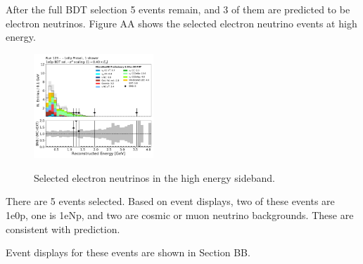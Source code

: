 After the full BDT selection 5 events remain, and 3 of them are predicted to be electron neutrinos.  
Figure AA shows the selected electron neutrino events at high energy.
\begin{figure}[H]
    \centering
    \includegraphics[width=0.4\textwidth]{1e0p/High_E_Sideband/BDT_selection/reco_e_07272020.pdf}
    \caption{Selected electron neutrinos in the high energy sideband.}
    \caption{} 
    \label{fig:HE_1eNp_1}
\end{figure}

There are 5 events selected.  Based on event displays, two of these events are 1e0p, one is 1eNp, and two are cosmic or muon neutrino backgrounds.  These are consistent with prediction.

Event displays for these events are shown in Section BB.

